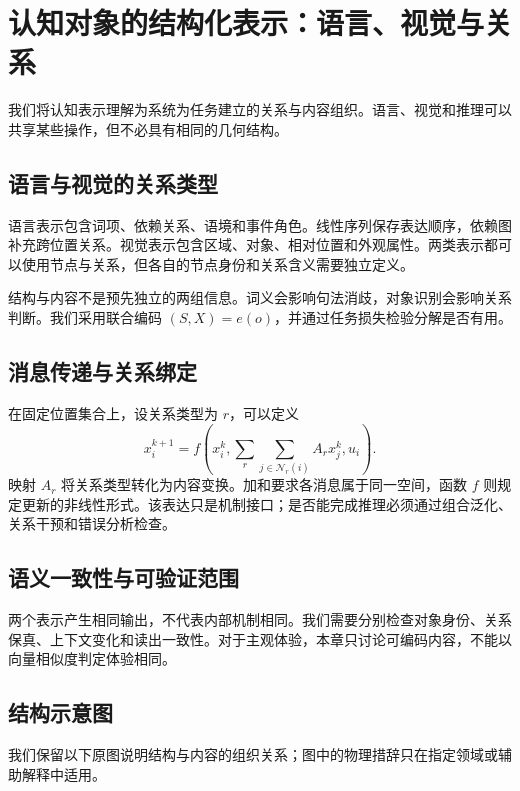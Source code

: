 \chapter{认知对象的结构化表示：语言、视觉与关系}
\label{chp:semantic_anatomy}
\label{sec:language_structure}
\label{sec:vision_structure}
\label{sec:logic_structure}
我们将认知表示理解为系统为任务建立的关系与内容组织。语言、视觉和推理可以共享某些操作，但不必具有相同的几何结构。
\section{语言与视觉的关系类型}
语言表示包含词项、依赖关系、语境和事件角色。线性序列保存表达顺序，依赖图补充跨位置关系。视觉表示包含区域、对象、相对位置和外观属性。两类表示都可以使用节点与关系，但各自的节点身份和关系含义需要独立定义。

结构与内容不是预先独立的两组信息。词义会影响句法消歧，对象识别会影响关系判断。我们采用联合编码 $(S,X)=e(o)$，并通过任务损失检验分解是否有用。
\section{消息传递与关系绑定}
在固定位置集合上，设关系类型为 $r$，可以定义
\begin{equation}x_i^{k+1}=f\left(x_i^k,\sum_r\sum_{j\in\mathcal N_r(i)}A_r x_j^k,u_i\right).\end{equation}
映射 $A_r$ 将关系类型转化为内容变换。加和要求各消息属于同一空间，函数 $f$ 则规定更新的非线性形式。该表达只是机制接口；是否能完成推理必须通过组合泛化、关系干预和错误分析检查。
\section{语义一致性与可验证范围}
两个表示产生相同输出，不代表内部机制相同。我们需要分别检查对象身份、关系保真、上下文变化和读出一致性。对于主观体验，本章只讨论可编码内容，不能以向量相似度判定体验相同。

\section{结构示意图}
我们保留以下原图说明结构与内容的组织关系；图中的物理措辞只在指定领域或辅助解释中适用。

